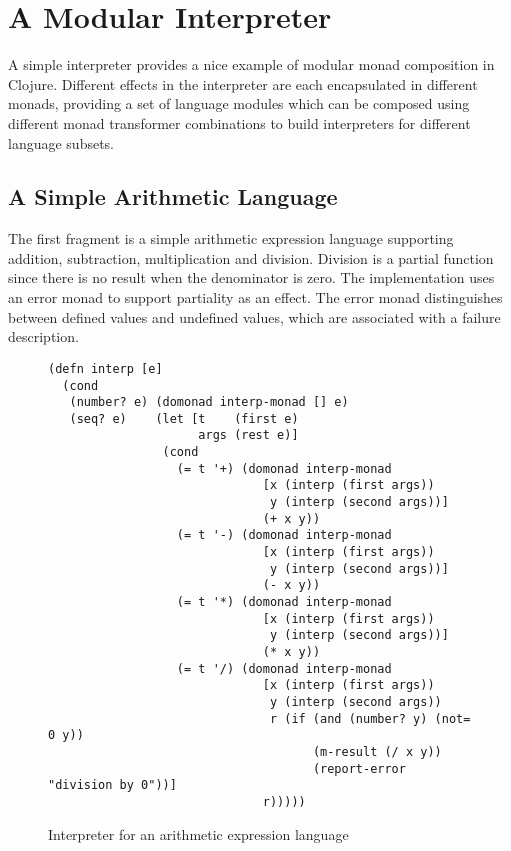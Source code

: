 \documentclass[natbib,10pt]{sigplanconf}
\begin{document}
\section{A Modular Interpreter}

A simple interpreter provides a nice example of modular monad
composition in Clojure.  Different effects in the interpreter are each
encapsulated in different monads, providing a set of language modules
which can be composed using different monad transformer combinations
to build interpreters for different language subsets.

\subsection {A Simple Arithmetic Language}
The first fragment is a simple arithmetic expression language
supporting addition, subtraction, multiplication and division.
Division is a partial function since there is no result when the
denominator is zero.  The implementation uses an error monad to
support partiality as an effect.  The error monad distinguishes
between defined values and undefined values, which are associated
with a failure description.

\begin{figure*}
\begin{center}
\begin{verbatim}
(defn interp [e]
  (cond
   (number? e) (domonad interp-monad [] e)
   (seq? e)    (let [t    (first e)
                     args (rest e)]
                (cond
                  (= t '+) (domonad interp-monad
                              [x (interp (first args))
                               y (interp (second args))]
                              (+ x y))
                  (= t '-) (domonad interp-monad
                              [x (interp (first args))
                               y (interp (second args))]
                              (- x y))
                  (= t '*) (domonad interp-monad
                              [x (interp (first args))
                               y (interp (second args))]
                              (* x y))
                  (= t '/) (domonad interp-monad
                              [x (interp (first args))
                               y (interp (second args))
                               r (if (and (number? y) (not= 0 y))
                                     (m-result (/ x y))
                                     (report-error "division by 0"))]
                              r)))))
\end{verbatim}
\end{center}
\caption{Interpreter for an arithmetic expression language}
\label{fig-interp-0}
\end{figure*}
\end{document}
